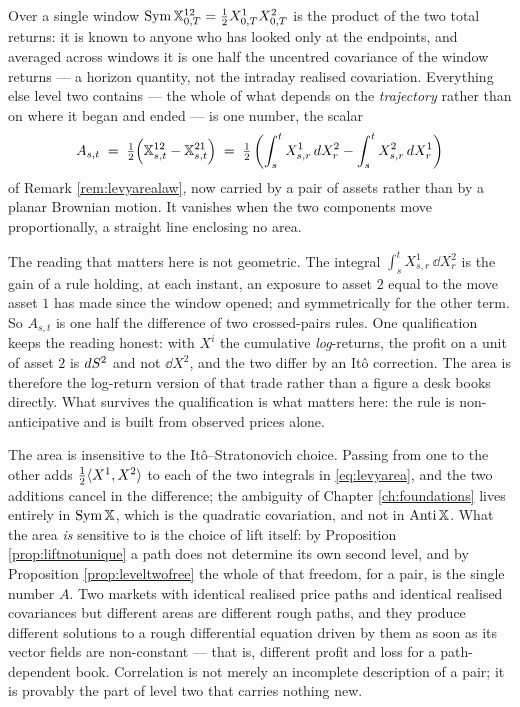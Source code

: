  Over a
single window $\operatorname{Sym}\mathbb{X}^{12}_{0,T}=\tfrac12X^{1}_{0,T}X^{2}_{0,T}$ is the product of the two
total returns: it is known to anyone who has looked only at the endpoints, and averaged across
windows it is one half the uncentred covariance of the window returns --- a horizon quantity, not the
intraday realised covariation. Everything else level two contains --- the whole of what
depends on the \emph{trajectory} rather than on where it began and ended --- is one number, the
scalar
\begin{equation}\label{eq:pairarea}
  A_{s,t}\;=\;\tfrac12\Bigl(\mathbb{X}^{12}_{s,t}-\mathbb{X}^{21}_{s,t}\Bigr)
  \;=\;\tfrac12\left(\int_s^t X^{1}_{s,r}\,d X^{2}_{r}-\int_s^t X^{2}_{s,r}\,d X^{1}_{r}\right)
\end{equation}
of Remark \ref{rem:levyarealaw}, now carried by a pair of assets rather than by a planar Brownian
motion. It vanishes when the two components move proportionally, a straight line enclosing no area.

\begin{remark}\label{rem:areaispnl}
The reading that matters here is not geometric. The integral $\int_s^tX^{1}_{s,r}\,\dd X^{2}_{r}$ is
the gain of a rule holding, at each instant, an exposure to asset $2$ equal to the move asset $1$
has made since the window opened; and symmetrically for the other term. So $A_{s,t}$ is one half the
difference of two crossed-pairs rules. One qualification keeps the reading honest: with $X^{i}$ the
cumulative \emph{log}-returns, the profit on a unit of asset $2$ is $dS^{2}$ and not
$\dd X^{2}$, and the two differ by an It\^o correction. The area is therefore the log-return version
of that trade rather than a figure a desk books directly. What survives the qualification is what
matters here: the rule is non-anticipative and is built from observed prices alone.
\end{remark}

\begin{remark}[Conventions]\label{rem:areaconventions}
The area is insensitive to the Itô--Stratonovich choice. Passing from one to the other adds
$\tfrac12\langle X^{1}, X^{2} \rangle$ to each of the two integrals in \eqref{eq:levyarea}, and the two
additions cancel in the difference; the ambiguity of Chapter \ref{ch:foundations} lives entirely in
$\operatorname{Sym}\mathbb{X}$, which is the quadratic covariation, and not in $\operatorname{Anti}\mathbb{X}$. What the area \emph{is}
sensitive to is the choice of lift itself: by Proposition \ref{prop:liftnotunique} a path does not
determine its own second level, and by Proposition \ref{prop:leveltwofree} the whole of that freedom,
for a pair, is the single number $A$. Two markets with identical realised price paths and
identical realised covariances but different areas are different rough paths, and they produce
different solutions to a rough differential equation driven by them as soon as its vector fields are
non-constant --- that is, different profit and loss for a path-dependent book. Correlation is not
merely an incomplete description of a pair; it is provably the part of level two that carries nothing
new.
\end{remark}



